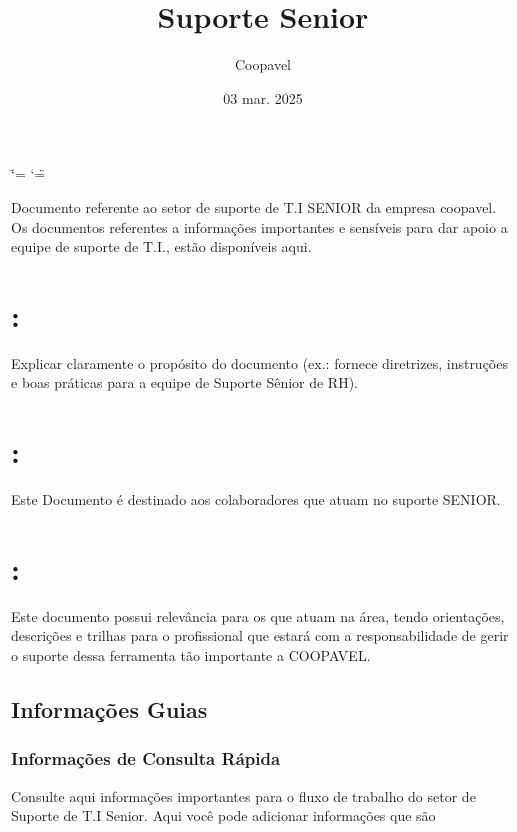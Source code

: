 \documentclass[letterpaper,10pt,brazil]{sphinxmanual}
\title{Suporte Senior}
\date{03 mar. 2025}
\author{Coopavel}
\begin{document}
\ifdefined\shorthandoff
  \ifnum\catcode`\=\string=\active\shorthandoff{=}\fi
  \ifnum\catcode`\"=\active{}\fi
\fi

\pagestyle{empty}
\sphinxmaketitle
\pagestyle{plain}
\sphinxtableofcontents
\pagestyle{normal}
\label{\detokenize{index::doc}}


\sphinxAtStartPar
Documento referente ao setor de suporte de T.I SENIOR da empresa coopavel. Os documentos referentes a
informações importantes e sensíveis para dar apoio a equipe de suporte de T.I., estão disponíveis aqui.


\chapter{:}
\label{\detokenize{index:objetivo-do-documento}}
\sphinxAtStartPar
Explicar claramente o propósito do documento (ex.: fornece diretrizes,
instruções e boas práticas para a equipe de Suporte Sênior de RH).


\chapter{:}
\label{\detokenize{index:publico-alvo}}
\sphinxAtStartPar
Este Documento é destinado aos colaboradores que atuam no suporte
SENIOR.


\chapter{:}
\label{\detokenize{index:importancia-do-conteudo}}
\sphinxAtStartPar
Este documento possui relevância para os que atuam na área, tendo
orientações, descrições e trilhas para o profissional que estará com a
responsabilidade de gerir o suporte dessa ferramenta tão importante a
COOPAVEL.

\sphinxstepscope


\section{Informações Guias}
\label{\detokenize{info:informacoes-guias}}\label{\detokenize{info::doc}}

\subsection{Informações de Consulta Rápida}
\label{\detokenize{info:informacoes-de-consulta-rapida}}
\sphinxAtStartPar
Consulte aqui informações importantes para o fluxo de trabalho do setor de Suporte de T.I Senior.
Aqui você pode adicionar informações que são
\end{document}
